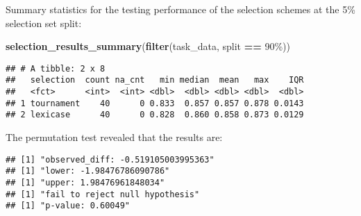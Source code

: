 \documentclass[
]{book}
\newenvironment{Shaded}{\begin{snugshade}}{\end{snugshade}}
\newcommand{\AttributeTok}[1]{\textcolor[rgb]{0.13,0.29,0.53}{#1}}
\newcommand{\DecValTok}[1]{\textcolor[rgb]{0.00,0.00,0.81}{#1}}
\newcommand{\FunctionTok}[1]{\textcolor[rgb]{0.13,0.29,0.53}{\textbf{#1}}}
\newcommand{\NormalTok}[1]{#1}
\newcommand{\OtherTok}[1]{\textcolor[rgb]{0.56,0.35,0.01}{#1}}
\newcommand{\SpecialCharTok}[1]{\textcolor[rgb]{0.81,0.36,0.00}{\textbf{#1}}}
\newcommand{\StringTok}[1]{\textcolor[rgb]{0.31,0.60,0.02}{#1}}
\begin{document}
Summary statistics for the testing performance of the selection schemes at the 5\% selection set split:

\begin{Shaded}
\begin{Highlighting}[]
\FunctionTok{selection\_results\_summary}\NormalTok{(}\FunctionTok{filter}\NormalTok{(task\_data, split }\SpecialCharTok{==} \StringTok{\textquotesingle{}90\%\textquotesingle{}}\NormalTok{))}
\end{Highlighting}
\end{Shaded}

\begin{verbatim}
## # A tibble: 2 x 8
##   selection  count na_cnt   min median  mean   max    IQR
##   <fct>      <int>  <int> <dbl>  <dbl> <dbl> <dbl>  <dbl>
## 1 tournament    40      0 0.833  0.857 0.857 0.878 0.0143
## 2 lexicase      40      0 0.828  0.860 0.858 0.873 0.0129
\end{verbatim}

The permutation test revealed that the results are:

\begin{Shaded}
\end{Shaded}

\begin{verbatim}
## [1] "observed_diff: -0.519105003995363"
## [1] "lower: -1.98476786090786"
## [1] "upper: 1.98476961848034"
## [1] "fail to reject null hypothesis"
## [1] "p-value: 0.60049"
\end{verbatim}
\end{document}
